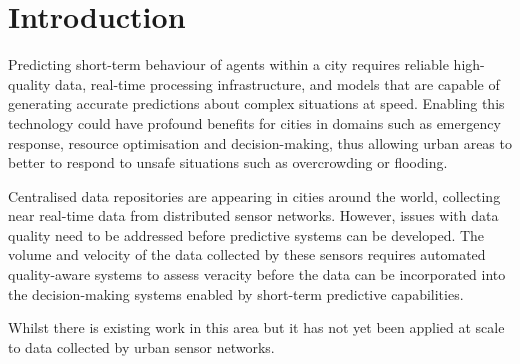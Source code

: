 \section{Introduction}

Predicting short-term behaviour of agents within a city requires reliable high-quality data, real-time processing infrastructure, and models that are capable of generating accurate predictions about complex situations at speed. Enabling this technology could have profound benefits for cities in domains such as emergency response, resource optimisation and decision-making, thus allowing urban areas to better to respond to unsafe situations such as overcrowding or flooding.

Centralised data repositories are appearing in cities around the world, collecting near real-time data from distributed sensor networks. However, issues with data quality need to be addressed before predictive systems can be developed. The volume and velocity of the data collected by these sensors requires automated quality-aware systems to assess veracity before the data can be incorporated into the decision-making systems enabled by short-term predictive capabilities.

Whilst there is existing work in this area but it has not yet been applied at scale to data collected by urban sensor networks.

